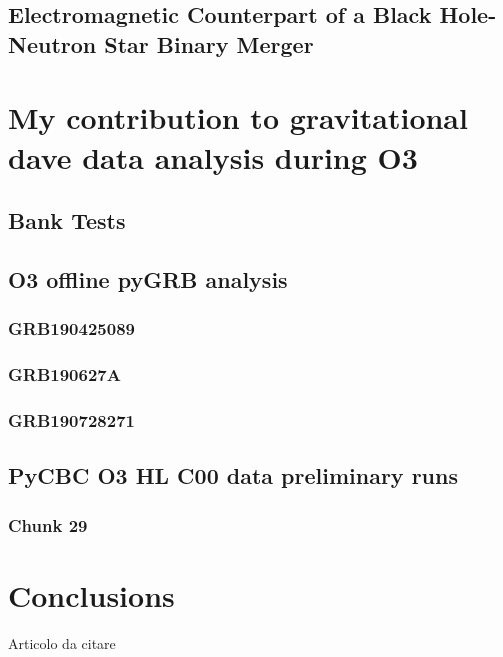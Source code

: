 \documentclass[binding=0.6cm, LaM]{sapthesis}
\begin{document}
\section{Electromagnetic Counterpart of a Black Hole-Neutron Star Binary Merger}


\chapter{My contribution to gravitational dave data analysis during O3}

\section{Bank Tests}

\section{O3 offline pyGRB analysis}

\subsection{GRB190425089}

\subsection{GRB190627A}

\subsection{GRB190728271}

\section{PyCBC O3 HL C00 data preliminary runs}

\subsection{Chunk 29}

\chapter{Conclusions}

\cite[]{1}
\backmatter
\cleardoublepage


\begin{thebibliography}{100}
    Articolo da citare
\end{thebibliography}

\printbibliography
\end{document}
